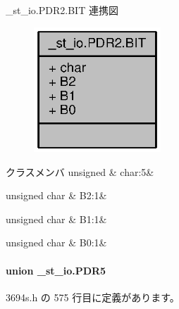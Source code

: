 \+\_\+st\+\_\+io.\+P\+D\+R2.\+B\+I\+T 連携図
\nopagebreak
\begin{figure}[H]
\begin{center}
\leavevmode
\includegraphics[width=135pt]{d4/d1f/struct__st__io_8PDR2_8BIT__coll__graph}
\end{center}
\end{figure}
\begin{DoxyFields}{クラスメンバ}
unsigned\label{3694s_8h_aa87deb01c5f539e6bda34829c8ef2368}
&
char\+:5&
\\
\hline

unsigned char\label{3694s_8h_abbd97b00c539801e32317ab550867ec4}
&
B2\+:1&
\\
\hline

unsigned char\label{3694s_8h_ac9512565ef6194ca664dc41ec0de7a53}
&
B1\+:1&
\\
\hline

unsigned char\label{3694s_8h_a4c769c2c9989abb9fa024ab9930270e5}
&
B0\+:1&
\\
\hline

\end{DoxyFields}
\label{union__st__io_8PDR5}
\paragraph{union \+\_\+st\+\_\+io.\+P\+D\+R5}


 3694s.\+h の 575 行目に定義があります。



